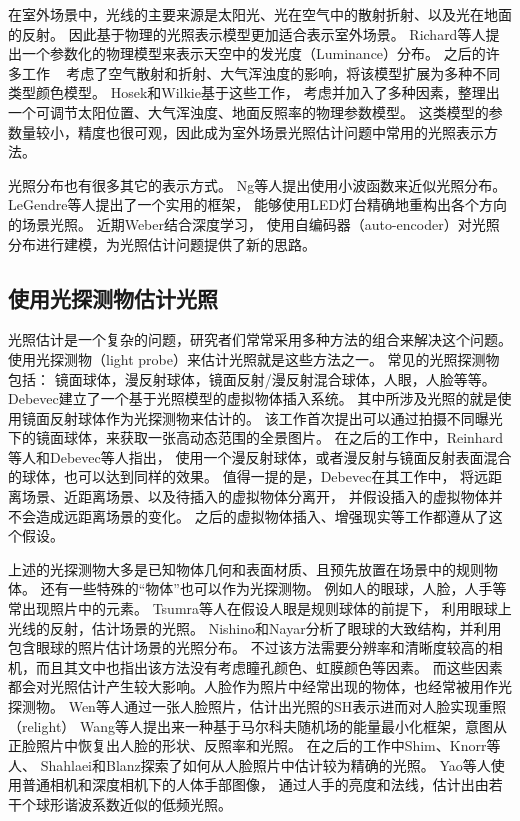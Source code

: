 在室外场景中，光线的主要来源是太阳光、光在空气中的散射折射、以及光在地面的反射。
因此基于物理的光照表示模型更加适合表示室外场景。
Richard等人\cite{perez1993all}提出一个参数化的物理模型来表示天空中的发光度（Luminance）分布。
之后的许多工作
~\cite{nishita1996display, sirai1993display, preetham1999practical,raab2008unbiased}
考虑了空气散射和折射、大气浑浊度的影响，将该模型扩展为多种不同类型颜色模型。
Hosek和Wilkie\cite{hosek2012analytic, hovsekhovsek2013adding}基于这些工作，
考虑并加入了多种因素，整理出一个可调节太阳位置、大气浑浊度、地面反照率的物理参数模型。
这类模型的参数量较小，精度也很可观，因此成为室外场景光照估计问题中常用的光照表示方法。

光照分布也有很多其它的表示方式。
Ng等人\cite{ng2003all}提出使用小波函数来近似光照分布。
LeGendre等人\cite{legendre2016practical}提出了一个实用的框架，
能够使用LED灯台精确地重构出各个方向的场景光照。
近期Weber\cite{weber2018learning}结合深度学习，
使用自编码器（auto-encoder）对光照分布进行建模，为光照估计问题提供了新的思路。

\subsection{使用光探测物估计光照} 
光照估计是一个复杂的问题，研究者们常常采用多种方法的组合来解决这个问题。
使用光探测物（light probe）来估计光照就是这些方法之一。
常见的光照探测物包括：
镜面球体，漫反射球体，镜面反射/漫反射混合球体，人眼，人脸等等。
Debevec\cite{debevec1998rendering}建立了一个基于光照模型的虚拟物体插入系统。
其中所涉及光照的就是使用镜面反射球体作为光探测物来估计的。
该工作首次提出可以通过拍摄不同曝光下的镜面球体，来获取一张高动态范围的全景图片。
在之后的工作中，Reinhard等人\cite{reinhard2005high}和Debevec等人\cite{debevec2012single}指出，
使用一个漫反射球体，或者漫反射与镜面反射表面混合的球体，也可以达到同样的效果。 
值得一提的是，Debevec在其工作\cite{debevec1998rendering}中，
将远距离场景、近距离场景、以及待插入的虚拟物体分离开，
并假设插入的虚拟物体并不会造成远距离场景的变化。
之后的虚拟物体插入、增强现实等工作都遵从了这个假设。

上述的光探测物大多是已知物体几何和表面材质、且预先放置在场景中的规则物体。
还有一些特殊的“物体”也可以作为光探测物。
例如人的眼球，人脸，人手等常出现照片中的元素。
Tsumra等人\cite{tsumura2003estimating}在假设人眼是规则球体的前提下，
利用眼球上光线的反射，估计场景的光照。
Nishino和Nayar\cite{nishino2004eyes}分析了眼球的大致结构，并利用包含眼球的照片估计场景的光照分布。
不过该方法需要分辨率和清晰度较高的相机，而且其文中也指出该方法没有考虑瞳孔颜色、虹膜颜色等因素。
而这些因素都会对光照估计产生较大影响。人脸作为照片中经常出现的物体，也经常被用作光探测物。
Wen等人\cite{wen2003face}通过一张人脸照片，估计出光照的SH表示进而对人脸实现重照（relight）
Wang等人\cite{wang2007face}提出来一种基于马尔科夫随机场的能量最小化框架，意图从正脸照片中恢复出人脸的形状、反照率和光照。   
在之后的工作中Shim\cite{shim2012faces}、Knorr等人\cite{knorr2014real}、
Shahlaei和Blanz\cite{shahlaei2015realistic}探索了如何从人脸照片中估计较为精确的光照。
Yao等人\cite{yao2013hand}使用普通相机和深度相机下的人体手部图像，
通过人手的亮度和法线，估计出由若干个球形谐波系数近似的低频光照。

